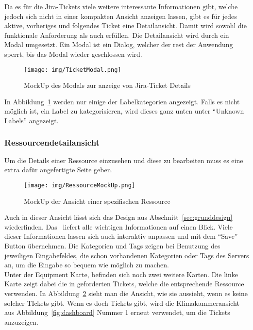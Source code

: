 Da es für die Jira-Tickets viele weitere interessante Informationen gibt, welche
jedoch sich nicht in einer kompakten Ansicht anzeigen lassen, gibt es für jedes
aktive, vorheriges und folgendes Ticket eine Detailansicht. Damit wird sowohl die
funktionale Anforderung  als auch  erfüllen.
Die Detailansicht wird durch ein Modal umgesetzt. Ein Modal ist ein Dialog, welcher der rest der Anwendung sperrt,
bis das Modal wieder geschlossen wird.

\begin{figure}[H]
    \texttt{[image: img/TicketModal.png]}
    \caption{MockUp des Modals zur anzeige von Jira-Ticket Details}\label{fig:modal}
\end{figure}

In Abbildung~\ref{fig:modal} werden nur einige der Labelkategorien angezeigt.
Falls es nicht möglich ist, ein Label zu kategorisieren, wird dieses ganz unten 
unter ``Unknown Labels'' angezeigt. 

\subsubsection{Ressourcendetailansicht}
Um die Details einer Ressource einzusehen und diese zu bearbeiten muss es eine 
extra dafür angefertigte Seite geben. 

\begin{figure}[H]
    \texttt{[image: img/RessourceMockUp.png]}
    \caption{MockUp der Ansicht einer spezifischen Ressource}\label{fig:ressource}
\end{figure}

Auch in dieser Ansicht lässt sich das Design aus Abschnitt~\ref{sec:grunddesign}
wiederfinden. Das~ liefert alle wichtigen Informationen
auf einen Blick. Viele dieser Informationen lassen sich auch interaktiv anpassen
und mit dem ``Save'' Button übernehmen. Die Kategorien und Tags zeigen bei Benutzung
des jeweiligen Eingabefeldes, die schon vorhandenen Kategorien oder Tags des Servers
an, um die Eingabe so bequem wie möglich zu machen. \\

Unter der Equipment Karte, befinden sich noch zwei weitere Karten. Die linke Karte
zeigt dabei die in  geforderten Tickets, welche die 
entsprechende Ressource verwenden. In Abbildung~\ref{fig:ressource} sieht man die Ansicht,
wie sie aussieht, wenn es keine solcher TIckets gibt. Wenn es doch Tickets gibt, 
wird die Klimakammeransicht aus Abbildung~\ref{fig:dashboard} Nummer 1 erneut verwendet,
um die Tickets anzuzeigen.

